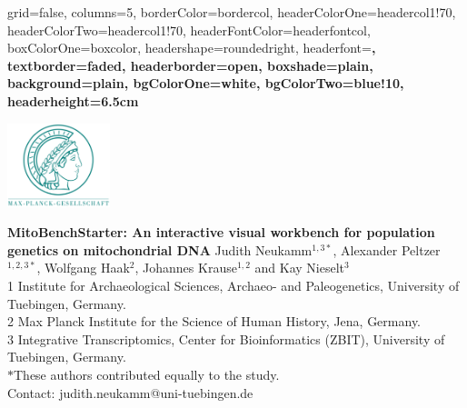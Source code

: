 \documentclass[a0paper,portrait]{baposter}
\begin{document}


\begin{poster}{
	grid=false,
	columns=5,
	borderColor=bordercol,
	headerColorOne=headercol1!70,%
	headerColorTwo=headercol1!70,%
	headerFontColor=headerfontcol,
	boxColorOne=boxcolor,
	headershape=roundedright,
	headerfont=\large\sf\bf,
	textborder=faded,%
	headerborder=open,
  	boxshade=plain,
	background=plain,%
	bgColorOne=white,
	bgColorTwo=blue!10,
	headerheight=6.5cm
}
{

	\includegraphics[width=3cm]{figures/Max-Planck-Gesellschaft.png}

}
{\Large\bf
	MitoBenchStarter: An interactive visual workbench for population genetics on mitochondrial DNA
}
{
	\vspace{1em} Judith Neukamm$^{1,3*}$, Alexander Peltzer$^{1,2,3*}$, Wolfgang Haak$^{2}$, Johannes Krause$^{1,2}$ and Kay Nieselt$^{3}$\\
	{\footnotesize 1 Institute for Archaeological Sciences, Archaeo- and Paleogenetics, University of Tuebingen, Germany.\\
	2 Max Planck Institute for the Science of Human History, Jena, Germany.\\
	3 Integrative Transcriptomics, Center for Bioinformatics (ZBIT), University of Tuebingen, Germany.\\
	$*$These authors contributed equally to the study.\\
	\vspace{1em}
	Contact: judith.neukamm@uni-tuebingen.de
	}
}
{

}
\end{poster}
\end{document}
